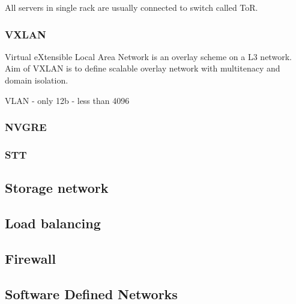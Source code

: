 All servers in single rack are usually connected to switch called \Ac{ToR}.


\subsubsection{VXLAN}
Virtual eXtensible Local Area Network is an overlay scheme on a L3 network. \cite{rfc7348} Aim of \Ac{VXLAN} is to define scalable overlay network with multitenacy and domain isolation. 

VLAN - only 12b - less than 4096

\subsubsection{NVGRE}
\subsubsection{STT}

\subsection{Storage network}

\subsection{Load balancing}

\subsection{Firewall}

\subsection{Software Defined Networks}
